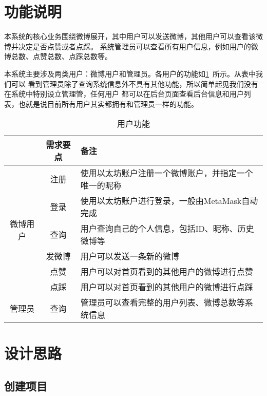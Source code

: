 \documentclass[bwprint]{hfutreport}
\begin{document}
\section{功能说明}
本系统的核心业务围绕微博展开，其中用户可以发送微博，其他用户可以查看该微博并决定是否点赞或者点踩。
系统管理员可以查看所有用户信息，例如用户的微博总数、点赞总数、点踩总数等。

本系统主要涉及两类用户：微博用户和管理员。各用户的功能如\cref{tab:func}~所示。从表中我们可以
看到管理员除了查询系统信息外不具有其他功能，所以简单起见我们没有在系统中特别设立管理管，任何用户
都可以在后台页面查看后台信息和用户列表，也就是说目前所有用户其实都拥有和管理员一样的功能。
\begin{table}[!htbp]
    \caption{用户功能}\label{tab:func}
    \centering
    \begin{tabular}{ccl}
        \hline
        \textbf{}                 & \textbf{需求要点} & \textbf{备注}                                        \\ \hline
        \multirow{6}{*}{微博用户} & 注册              & 使用以太坊账户注册一个微博账户，并指定一个唯一的昵称 \\
                                  & 登录              & 使用以太坊账户进行登录，一般由MetaMask自动完成       \\
                                  & 查询              & 用户查询自己的个人信息，包括ID、昵称、历史微博等     \\
                                  & 发微博              & 用户可以发送一条新的微博     \\
                                  & 点赞              & 用户可以对首页看到的其他用户的微博进行点赞           \\
                                  & 点踩              & 用户可以对首页看到的其他用户的微博进行点踩           \\ \hline
        管理员                    & 查询              & 管理员可以查看完整的用户列表、微博总数等系统信息     \\ \hline
    \end{tabular}
\end{table}

\section{设计思路}

\subsection{创建项目}
\end{document}
